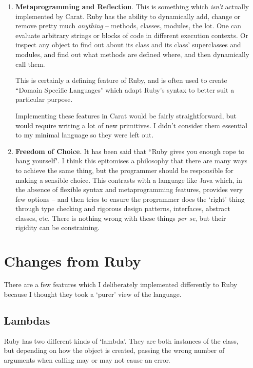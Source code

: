 \begin{enumerate}
  \item \textbf{Metaprogramming and Reflection}. This is something which \emph{isn't} actually implemented by Carat. Ruby has the ability to dynamically add, change or remove pretty much \emph{anything} -- methods, classes, modules, the lot. One can evaluate arbitrary strings or blocks of code in different execution contexts. Or inspect any object to find out about its class and its class' superclasses and modules, and find out what methods are defined where, and then dynamically call them.
  
  This is certainly a defining feature of Ruby, and is often used to create ``Domain Specific Languages" which adapt Ruby's syntax to better suit a particular purpose.
  
  Implementing these features in Carat would be fairly straightforward, but would require writing a lot of new primitives. I didn't consider them essential to my minimal language so they were left out.
  
  \item \textbf{Freedom of Choice}. It has been said that ``Ruby gives you enough rope to hang yourself". I think this epitomises a philosophy that there are many ways to achieve the same thing, but the programmer should be responsible for making a sensible choice. This contrasts with a language like Java which, in the absence of flexible syntax and metaprogramming features, provides very few options -- and then tries to ensure the programmer does the `right' thing through type checking and rigorous design patterns, interfaces, abstract classes, etc. There is nothing wrong with these things \emph{per se}, but their rigidity can be constraining.
\end{enumerate}

\section{Changes from Ruby}
\label{sec:ruby_comparison}

There are a few features which I deliberately implemented differently to Ruby because I thought they took a `purer' view of the language.

\subsection{Lambdas}

Ruby has two different kinds of `lambda'. They are both instances of the  class, but depending on how the object is created, passing the wrong number of arguments when calling may or may not cause an error.

